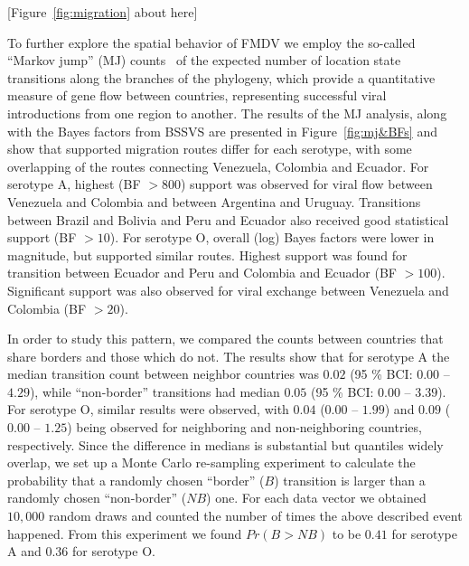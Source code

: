 \documentclass[10pt]{article}
\begin{document}
\begin{center}
 [Figure~\ref{fig:migration} about here]
\end{center}

To further explore the spatial behavior of FMDV we employ the so-called ``Markov jump'' (MJ) counts~\cite{Minin2008} of the expected number of location state transitions along the  branches of the phylogeny, which  provide a quantitative measure of gene flow between countries, representing successful viral introductions from one region to another.
The results of the MJ analysis, along with the Bayes factors from BSSVS are presented in Figure~\ref{fig:mj&BFs} and show that supported migration routes differ for each serotype, with some overlapping of the routes connecting Venezuela, Colombia and Ecuador.
For serotype A, highest (BF $>800$) support was observed for viral flow between Venezuela and Colombia and between Argentina and Uruguay.
Transitions between Brazil and Bolivia and Peru and Ecuador also received good statistical support (BF $>10$).
For serotype O, overall (log) Bayes factors were lower in magnitude, but supported similar routes.
Highest support was found for transition between Ecuador and Peru and Colombia and Ecuador (BF $>100$). Significant support was also observed for viral exchange between Venezuela and Colombia (BF $>20$). 


In order to study this pattern, we compared the counts between countries that share borders and those which do not.
The results show that for serotype A the median transition count between neighbor countries was $0.02$ (95 \% BCI: $0.00$ -- $4.29$), while ``non-border'' transitions had median $0.05$ (95 \% BCI: $0.00$ --  $3.39$).
For serotype O, similar results were observed, with $0.04$ ($0.00$ -- $1.99$) and $0.09$ ($0.00$ -- $1.25$) being observed for neighboring and non-neighboring countries, respectively.
Since the difference in medians is substantial but quantiles widely overlap, we set up a Monte Carlo re-sampling experiment to calculate the probability that a randomly chosen ``border'' ($B$) transition is larger than a randomly chosen ``non-border'' ($NB$) one. For each data vector we obtained $10,000$ random draws and counted the number of times the above described event happened. From this experiment we found $Pr(B>NB)$  to be $0.41$ for serotype A and $0.36$ for serotype O.
\end{document}

